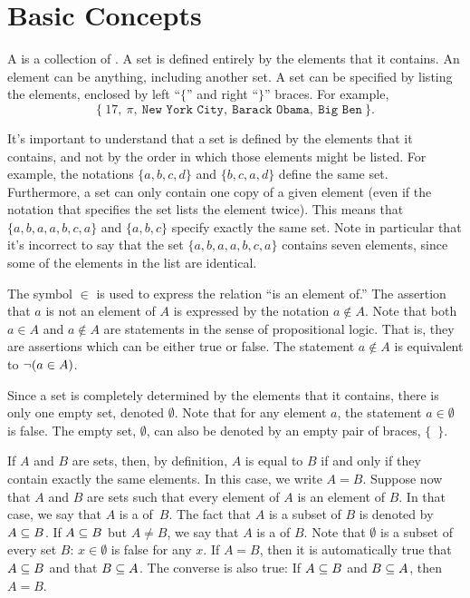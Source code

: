 \section{Basic Concepts}\label{S-sets-1}

A  is a collection of .
A set is defined entirely by the elements that it contains.
An element can be anything, including another set.
A set can be specified by listing the elements, enclosed by left ``$\{$'' and right ``$\}$'' braces.
For example, 
\[\{\ 17,\ \pi,\ \texttt{New York City},\ \texttt{Barack Obama},\ \texttt{Big Ben}\ \}.\]

It's important to understand that a set is defined by the elements that it contains, and not by the order in which those elements might be listed.
For example, the notations $\{a,b,c,d\}$ and $\{b,c,a,d\}$ define the same set.
Furthermore, a set can only contain one copy of a given element (even if the notation that specifies the set lists the element twice).
This means that $\{a,b,a,a,b,c,a\}$ and $\{a,b,c\}$ specify exactly the same set.
Note in particular that it's incorrect to say that the set $\{a,b,a,a,b,c,a\}$ contains seven elements, since some of the elements in the list are identical.

The symbol $\in$ is used to express the relation ``is an element of.''
The assertion that $a$ is not an element of $A$ is expressed by the notation $a\not\in A$.
Note that both $a\in A$ and $a\not\in A$ are statements in the sense of propositional logic.
That is, they are assertions which can be either true or false.
The statement $a\not\in A$ is equivalent to $\lnot(a\in A)$.

Since a set is completely determined by the elements that it contains, there is only one empty set, denoted $\emptyset$.
Note that for any element $a$, the statement $a\in\emptyset$ is false.
The empty set, $\emptyset$, can also be denoted by an empty pair of braces, $\{$~$\}$.

If $A$ and $B$ are sets, then, by definition, $A$ is equal to $B$ if and only
if they contain exactly the same elements.  In this case, we write $A=B$.
Suppose now that $A$ and $B$ are sets such that every element of $A$ is an element of $B$.  
In that case, we say that $A$ is a  of~$B$.
 The fact that $A$ is a subset of $B$ is denoted by $A\subseteq B$.
If $A\subseteq B$ but $A\not= B$, we say that $A$ is a  of $B$.
Note that $\emptyset$ is a subset of every set $B$: $x \in \emptyset$ is false for any $x$.
If $A=B$, then it is automatically true that $A\subseteq B$ and that
$B\subseteq A$.
The converse is also true: If $A\subseteq B$ and $B\subseteq A$, then $A=B$.

